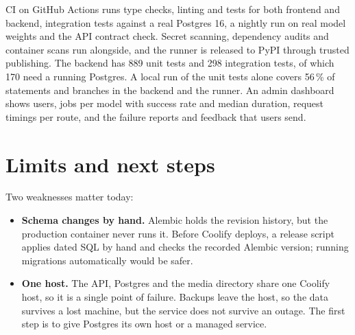 \documentclass[11pt,a4paper]{article}
\begin{document}
CI on GitHub Actions runs type checks, linting and tests for both frontend and backend, integration tests against a real Postgres 16, a nightly run on real model weights and the API contract check. Secret scanning, dependency audits and container scans run alongside, and the runner is released to PyPI through trusted publishing. The backend has 889 unit tests and 298 integration tests, of which 170 need a running Postgres. A local run of the unit tests alone covers 56\,\% of statements and branches in the backend and the runner. An admin dashboard shows users, jobs per model with success rate and median duration, request timings per route, and the failure reports and feedback that users send.

\section{Limits and next steps}

Two weaknesses matter today:
\begin{itemize}
  \item \textbf{Schema changes by hand.} Alembic holds the revision history, but the production container never runs it. Before Coolify deploys, a release script applies dated SQL by hand and checks the recorded Alembic version; running migrations automatically would be safer.
  \item \textbf{One host.} The API, Postgres and the media directory share one Coolify host, so it is a single point of failure. Backups leave the host, so the data survives a lost machine, but the service does not survive an outage. The first step is to give Postgres its own host or a managed service.
\end{itemize}
\end{document}
